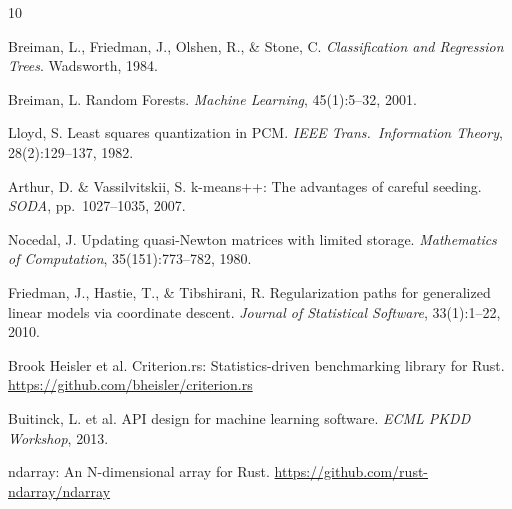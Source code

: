 \documentclass[11pt,a4paper]{article}
\begin{document}
\begin{thebibliography}{10}

Breiman, L., Friedman, J., Olshen, R., \& Stone, C.
\textit{Classification and Regression Trees}. Wadsworth, 1984.

Breiman, L. Random Forests.
\textit{Machine Learning}, 45(1):5--32, 2001.

Lloyd, S. Least squares quantization in PCM.
\textit{IEEE Trans.\ Information Theory}, 28(2):129--137, 1982.

Arthur, D. \& Vassilvitskii, S. k-means++: The advantages of
careful seeding. \textit{SODA}, pp.~1027--1035, 2007.

Nocedal, J. Updating quasi-Newton matrices with limited storage.
\textit{Mathematics of Computation}, 35(151):773--782, 1980.

Friedman, J., Hastie, T., \& Tibshirani, R. Regularization paths
for generalized linear models via coordinate descent.
\textit{Journal of Statistical Software}, 33(1):1--22, 2010.

Brook Heisler et al. Criterion.rs: Statistics-driven benchmarking
library for Rust. \url{https://github.com/bheisler/criterion.rs}

Buitinck, L. et al. API design for machine learning software.
\textit{ECML PKDD Workshop}, 2013.

ndarray: An N-dimensional array for Rust.
\url{https://github.com/rust-ndarray/ndarray}

\end{thebibliography}
\end{document}
